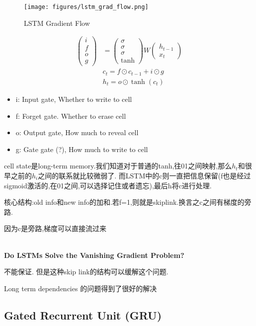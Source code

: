 	\begin{figure}[H]
		\centering
		\texttt{[image: figures/lstm\_grad\_flow.png]}
		\caption{LSTM Gradient Flow}
	\end{figure}

	\[
	\begin{aligned}
		\begin{pmatrix}i\\f\\o\\g\end{pmatrix}& =\begin{pmatrix}\sigma\\\sigma\\\sigma\\\tanh\end{pmatrix}W\begin{pmatrix}h_{t-1}\\x_t\end{pmatrix}  \\
		&c_{t} =f\odot c_{t-1}+i\odot g  \\
		&h_{t} =o\odot\tanh(c_t) 
	\end{aligned}
	\]

	\begin{itemize}
		\item i: Input gate, Whether to write to cell
		\item f: Forget gate. Whether to erase cell
		\item o: Output gate, How much to reveal cell
		\item g: Gate gate (?), How much to write to cell
	\end{itemize}
	
	cell state是long-term memory.我们知道对于普通的tanh,往01之间映射,那么$h_t$和很早之前的$h_i$之间的联系就比较微弱了.
	而LSTM中的c则一直把信息保留(f也是经过sigmoid激活的,在01之间,可以选择记住或者遗忘),最后h将c进行处理.
	
	核心结构:old info和new info的加和.若f=1,则就是skiplink.换言之c之间有梯度的旁路.

	因为c是旁路,梯度可以直接流过来

	\textbf{\\Do LSTMs Solve the Vanishing Gradient Problem?}

	不能保证. 但是这种skip link的结构可以缓解这个问题.

	Long term dependencies 的问题得到了很好的解决

	\subsection{Gated Recurrent Unit (GRU)}

